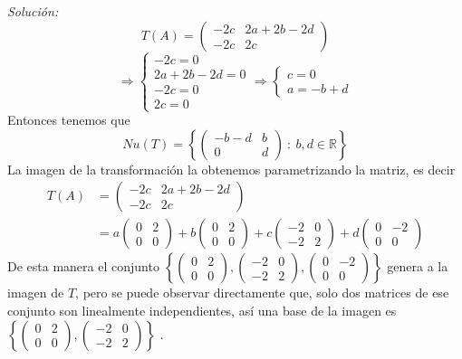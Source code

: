 \documentclass{article}
\newenvironment{solution}
    {\textit{Solución:}}
    {}
\begin{document}
\begin{solution}
\[
T(A)=\begin{pmatrix} -2c & 2a+2b-2d \\ -2c & 2c \end{pmatrix}
\]\[
\Rightarrow \begin{cases}
-2c = 0 \\
2a+2b-2d = 0 \\
-2c = 0 \\
2c = 0
\end{cases} \Rightarrow
\begin{cases}
c = 0 \\
a = -b+d
\end{cases}
\]
Entonces tenemos que
\[
Nu(T) = \left \{ \begin{pmatrix} -b-d & b \\ 0 & d \end{pmatrix} \ : \ b,d \in \mathbb{R}\right\}
\]
La imagen de la transformación la obtenemos parametrizando la matriz, es decir
\[
\begin{aligned}
T(A)&=\begin{pmatrix} -2c & 2a+2b-2d \\ -2c & 2c \end{pmatrix} \\
&= a \begin{pmatrix} 0 & 2 \\ 0 & 0 \end{pmatrix} +
b\begin{pmatrix} 0 & 2 \\ 0 & 0 \end{pmatrix} + c \begin{pmatrix} -2 & 0 \\ -2 & 2 \end{pmatrix} + d\begin{pmatrix} 0 & -2 \\ 0 & 0 \end{pmatrix}
\end{aligned}
\]
De esta manera el conjunto $\left \{ \begin{pmatrix} 0 & 2 \\ 0 & 0 \end{pmatrix}, \begin{pmatrix} -2 & 0 \\ -2 & 2 \end{pmatrix}, \begin{pmatrix} 0 & -2 \\ 0 & 0 \end{pmatrix} \right \}$ genera a la imagen de $T$, pero se puede observar directamente que, solo dos matrices de ese conjunto son linealmente independientes, así una base de la imagen es $\left \{ \begin{pmatrix} 0 & 2 \\ 0 & 0 \end{pmatrix}, \begin{pmatrix} -2 & 0 \\ -2 & 2 \end{pmatrix} \right \}$ .

\end{solution}
\end{document}
